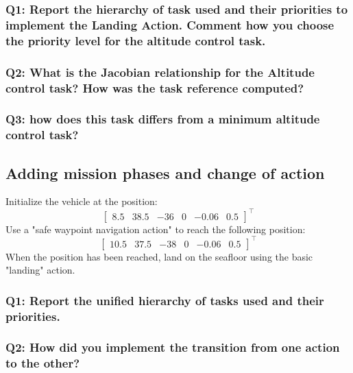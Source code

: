\documentclass{article}
\begin{document}
\subsubsection{Q1: Report the hierarchy of task used and their priorities to implement the Landing Action. Comment how you choose the priority level for the altitude control task.}

\subsubsection{Q2: What is the Jacobian relationship for the Altitude control task? How was the task reference computed?}

\subsubsection{Q3: how does this task differs from a minimum altitude control task?}

\subsection{Adding mission phases and change of action}
Initialize the vehicle at the position:
\begin{displaymath}
\begin{bmatrix} 8.5 & 38.5 & -36 & 0 & -0.06 & 0.5 \end{bmatrix}^\top
\end{displaymath} 
Use a "safe waypoint navigation action" to reach the following position: 
\begin{displaymath}
\begin{bmatrix} 10.5 & 37.5 & -38 & 0 & -0.06 & 0.5 \end{bmatrix}^\top
\end{displaymath} 
When the position has been reached, land on the seafloor using the basic "landing" action.

\subsubsection{Q1: Report the unified hierarchy of tasks used and their priorities.}

\subsubsection{Q2: How did you implement the transition from one action to the other?}

\clearpage
\end{document}
